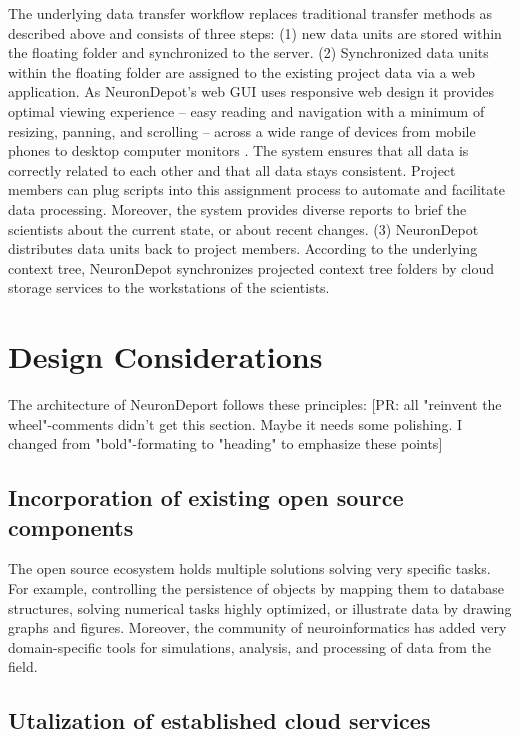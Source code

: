 \documentclass{frontiersSCNS} %
\newcommand{\pr}[1]{[\textcolor{YellowOrange}{PR: #1}]}
\begin{document}
The underlying data transfer workflow replaces traditional transfer methods as
described above and consists of three steps: (1) new data units are stored
within the floating folder and synchronized to the server. (2) Synchronized
data units within the floating folder are assigned to the existing project data
via a web application. As NeuronDepot's web GUI uses responsive web design it
provides optimal viewing experience -- easy reading and navigation with a
minimum of resizing, panning, and scrolling -- across a wide range of devices
from mobile phones to desktop computer monitors
\citep{marcotte_responsive_2010}. The system ensures that all data is
correctly related to each other and that all data stays consistent. Project
members can plug scripts into this assignment process to automate and
facilitate data processing. Moreover, the system provides diverse reports to
brief the scientists about the current state, or about recent changes. (3)
NeuronDepot distributes data units back to project members. According to the
underlying context tree, NeuronDepot synchronizes projected context tree
folders by cloud storage services to the workstations of the scientists.


\section{Design Considerations}
The architecture of NeuronDeport follows these principles:
\pr{all "reinvent the wheel"-comments didn't get this section. Maybe it needs
some polishing. I changed from "bold"-formating to "heading" to emphasize these
points}

\subsection{Incorporation of existing open source components}

The open source ecosystem holds multiple solutions solving very specific tasks.
For example, controlling the persistence of objects by mapping them to database
structures, solving numerical tasks highly optimized, or illustrate data by
drawing graphs and figures. Moreover, the community of neuroinformatics has
added  very domain-specific tools for simulations, analysis, and processing of
data from the field.

\subsection{Utalization of established cloud services}
\end{document}
